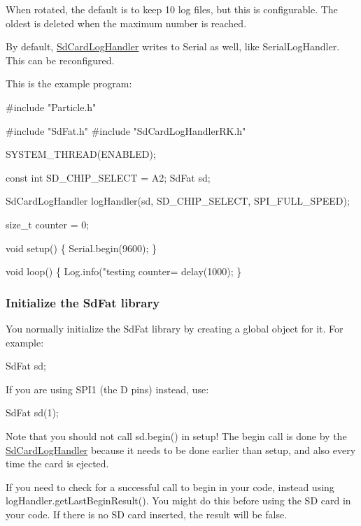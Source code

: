 When rotated, the default is to keep 10 log files, but this is configurable. The oldest is deleted when the maximum number is reached.

By default, \mbox{\hyperlink{class_sd_card_log_handler}{Sd\+Card\+Log\+Handler}} writes to Serial as well, like Serial\+Log\+Handler. This can be reconfigured.

This is the example program\+:


\begin{DoxyCode}
#include "Particle.h"

#include "SdFat.h"
#include "SdCardLogHandlerRK.h"

SYSTEM\_THREAD(ENABLED);

const int SD\_CHIP\_SELECT = A2;
SdFat sd;

SdCardLogHandler logHandler(sd, SD\_CHIP\_SELECT, SPI\_FULL\_SPEED);

size\_t counter = 0;

void setup() \{
    Serial.begin(9600);
\}

void loop() \{
    Log.info("testing counter=%
    delay(1000);
\}
\end{DoxyCode}


\subsubsection*{Initialize the Sd\+Fat library}

You normally initialize the Sd\+Fat library by creating a global object for it. For example\+:


\begin{DoxyCode}
SdFat sd;
\end{DoxyCode}


If you are using S\+P\+I1 (the D pins) instead, use\+:


\begin{DoxyCode}
SdFat sd(1);
\end{DoxyCode}


Note that you should not call {\ttfamily sd.\+begin()} in setup! The begin call is done by the \mbox{\hyperlink{class_sd_card_log_handler}{Sd\+Card\+Log\+Handler}} because it needs to be done earlier than setup, and also every time the card is ejected.

If you need to check for a successful call to begin in your code, instead using {\ttfamily log\+Handler.\+get\+Last\+Begin\+Result()}. You might do this before using the SD card in your code. If there is no SD card inserted, the result will be false.

